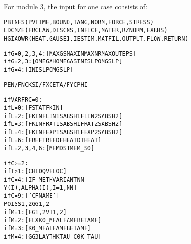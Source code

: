 \documentclass[12pt]{report}
\renewcommand{\magenta}[1]{}
\begin{document}
For module 3, the input for one case consists of:
\begin{alltt}\small
% Control integers, see section \ref{sec:controldigits}:

\magenta{ } PBTNFS      \magenta{        }       (PVTIME, BOUND , TANG  , NORM  , FORCE , STRESS)
\magenta{ } LDCMZE      \magenta{        }       (FRCLAW, DISCNS, INFLCF, MATER , RZNORM, EXRHS )
\magenta{X}HGIAOWR     (\magenta{XFLOW , }HEAT  , GAUSEI, IESTIM, MATFIL, OUTPUT, FLOW  , RETURN)

\magenta{% Parameters for additional debug output

if X=1:  [ PSFLRIN ] (PROFIL, SMOOTH, FORCE , LOCATE, READLN, INFLCF, NMDBG )

}% Parameters for the iterative solution algorithms (section \ref{sec:iter_const}):

if G=0,2,3,4: [ MAXGS   MAXIN   MAXNR   MAXOUT  EPS     ]
if G=2,3:     [ OMEGAH  OMEGAS  INISLP  OMGSLP          ]
if G=4:       [ INISLP  OMGSLP                          ]
\magenta{if G=5:       [ FDECAY  BETATH  KDOWFB  D\_IFC   D\_LIN   D\_CNS   D\_SLP   POW\_S ]
}
% Kinematics description (section \ref{sec:kincns}):
% Note: PEN  is needed when N=0,      FN when N=1
%       CKSI is needed when F=0,      FX when F=1 or 2
%       CETA is needed when F=0 or 1, FY when F=2

PEN/FN  CKSI/FX  CETA/FY  CPHI

% Friction description (section \ref{sec:fric_dscrp}):
%      L=0 --> Coulomb friction with static/kinetic coefficients
%      L=2 --> velocity dependent friction with linear/const formula
%      L=3 --> velocity dependent friction with rational formula
%      L=4 --> velocity dependent friction with exponential formula
%      L=6 --> temperature dependent friction with piecewise linear formula

if VARFRC=0:
      if L=0: [ FSTAT  FKIN                                ]
      if L=2: [ FKIN   FLIN1  SABSH1  FLIN2  SABSH2        ]
      if L=3: [ FKIN   FRAT1  SABSH1  FRAT2  SABSH2        ]
      if L=4: [ FKIN   FEXP1  SABSH1  FEXP2  SABSH2        ]
      if L=6: [ FREF   TREF   DFHEAT  DTHEAT               ]
if L=2,3,4,6: [ MEMDST MEM\_S0                              ]

% Information needed for influence coefficients,
% particularly the rolling direction and step size (section \ref{sec:kincns}),
% and the geometry/material configuration (section \ref{sec:matcns}):

if C>=2:\magenta{
      if T<=1 & M=5: [ DT                   ]}
      if T>1: [ CHI  DQ   VELOC             ]
      if C=4: [ IF\_METH   VARIANT   NN
                Y(I), ALPHA(I), I=1,NN      ]
      if C=9: [ 'CFNAME'                    ]
                POISS 1, 2   GG 1, 2
\magenta{      if B=1: [ FLXZ                        ]
}      if M=1: [ FG 1, 2   VT 1, 2           ]
      if M=2: [ FLX  K0\_MF   ALFAMF  BETAMF ]
      if M=3: [      K0\_MF   ALFAMF  BETAMF ]
      if M=4: [ GG3  LAYTHK  TAU\_C0  K\_TAU  ]


\end{alltt}
\end{document}

